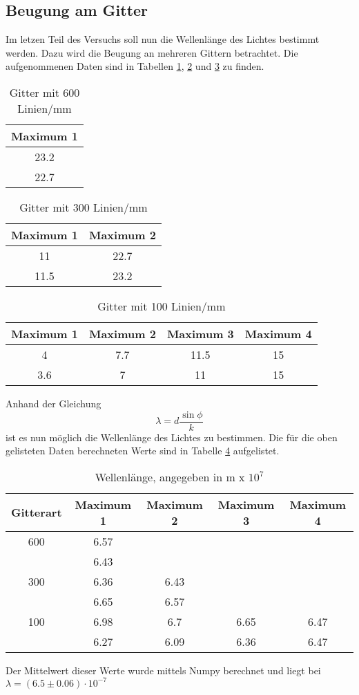 \subsection{Beugung am Gitter}
  Im letzen Teil des Versuchs soll nun die Wellenlänge des Lichtes bestimmt werden. Dazu 
  wird die Beugung an mehreren Gittern betrachtet. Die aufgenommenen Daten sind in Tabellen \ref{tab:gitter1},
  \ref{tab:gitter2} und \ref{tab:gitter3} zu finden.
  \begin{table}[H]
    \centering
    \caption{Gitter mit 600 Linien/mm}
    \begin{tabular}{c}
      \toprule
      Maximum 1\\
      \midrule
      23.2 \\
      22.7 \\
      \bottomrule
    \end{tabular}
    \label{tab:gitter1}
  \end{table}
  \begin{table}[H]
    \centering
    \caption{Gitter mit 300 Linien/mm}
    \begin{tabular}{c c}
      \toprule
      Maximum 1 & Maximum 2\\
      \midrule
      11   & 22.7 \\
      11.5 & 23.2 \\
      \bottomrule
    \end{tabular}
    \label{tab:gitter2}
  \end{table}
  \begin{table}[H]
    \centering
    \caption{Gitter mit 100 Linien/mm}
    \begin{tabular}{c c c c}
      \toprule
      Maximum 1 & Maximum 2 & Maximum 3 & Maximum 4\\
      \midrule
      4   & 7.7 & 11.5 & 15 \\
      3.6 & 7   & 11   & 15 \\
      \bottomrule
    \end{tabular}
    \label{tab:gitter3}
  \end{table}
  \noindent Anhand der Gleichung 
  \begin{equation*}
    \lambda = d \dfrac{\sin{\phi}}{k}
  \end{equation*}
  ist es nun möglich die Wellenlänge des Lichtes zu bestimmen. Die für die oben 
  gelisteten Daten berechneten Werte sind in Tabelle \ref{tab:wellen} aufgelistet.
  \begin{table}[H]
    \centering
    \caption{Wellenlänge, angegeben in m x $ 10^{7}$}
    \begin{tabular}{c c c c c}
      \toprule
      Gitterart & Maximum 1 & Maximum 2 & Maximum 3 & Maximum 4\\
      \midrule
      600&6.57   &&&\\
      &6.43&&&\\
      300&6.36& 6.43&& \\
      &6.65&6.57&&\\
      100&  6.98   &   6.7&  6.65&6.47 \\
      &6.27&6.09&6.36&6.47\\
      \bottomrule
    \end{tabular}
    \label{tab:wellen}
  \end{table}
  \noindent Der Mittelwert dieser Werte wurde mittels Numpy berechnet und liegt bei \\
  $\lambda=(6.5\pm0.06)\cdot 10^{-7}$